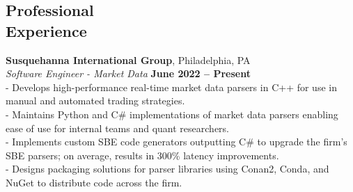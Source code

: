 \documentclass[margin,line]{resume}
\begin{document}
\begin{resume}
    \section{\mysidestyle Professional\\Experience}
    \textbf{Susquehanna International Group}, Philadelphia, PA \vspace{2mm}\\\vspace{1mm}%
    \textsl{Software Engineer - Market Data} \hfill \textbf{June 2022 -- Present}\\
    - Develops high-performance real-time market data parsers in C++ for use in manual and automated trading strategies.\vspace{1mm}\\%
    - Maintains Python and C\# implementations of market data parsers enabling ease of use for internal teams and quant researchers.\vspace{1mm}\\%
    - Implements custom SBE code generators outputting C\# to upgrade the firm's SBE parsers; on average, results in 300\% latency improvements.\vspace{1mm}\\%
    - Designs packaging solutions for parser libraries using Conan2, Conda, and NuGet to distribute code across the firm.


\end{resume}
\end{document}
